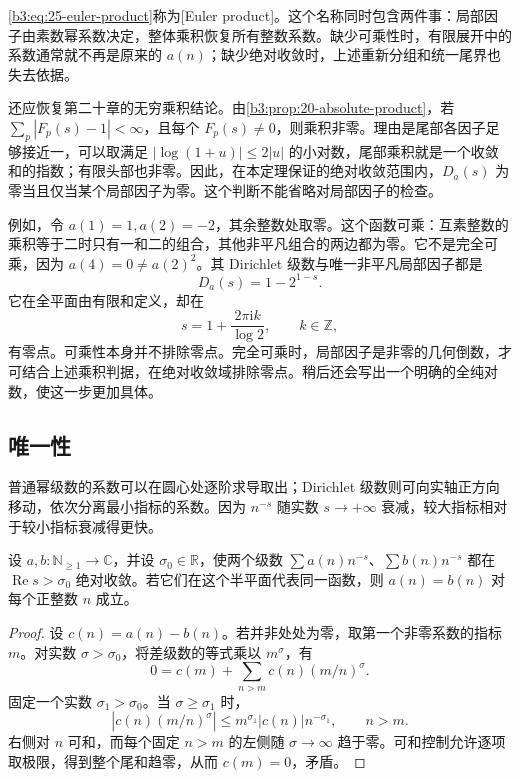 \eqref{b3:eq:25-euler-product}称为[Euler product]。这个名称同时包含两件事：局部因子由素数幂系数决定，整体乘积恢复所有整数系数。缺少可乘性时，有限展开中的系数通常就不再是原来的 \(a(n)\)；缺少绝对收敛时，上述重新分组和统一尾界也失去依据。

还应恢复第二十章的无穷乘积结论。由\cref{b3:prop:20-absolute-product}，若 \(\sum_p|F_p(s)-1|<\infty\)，且每个 \(F_p(s)\ne0\)，则乘积非零。理由是尾部各因子足够接近一，可以取满足 \(|\log(1+u)|\le2|u|\) 的小对数，尾部乘积就是一个收敛和的指数；有限头部也非零。因此，在本定理保证的绝对收敛范围内，\(D_a(s)\) 为零当且仅当某个局部因子为零。这个判断不能省略对局部因子的检查。

例如，令 \(a(1)=1,a(2)=-2\)，其余整数处取零。这个函数可乘：互素整数的乘积等于二时只有一和二的组合，其他非平凡组合的两边都为零。它不是完全可乘，因为 \(a(4)=0\ne a(2)^2\)。其 Dirichlet 级数与唯一非平凡局部因子都是
\[
 D_a(s)=1-2^{1-s}.
\]
它在全平面由有限和定义，却在
\[
 s=1+\frac{2\pi\mathrm i k}{\log2},\qquad k\in\mathbb Z,
\]
有零点。可乘性本身并不排除零点。完全可乘时，局部因子是非零的几何倒数，才可结合上述乘积判据，在绝对收敛域排除零点。稍后还会写出一个明确的全纯对数，使这一步更加具体。

\subsection{唯一性}
\label{b3:subsec:250502}

普通幂级数的系数可以在圆心处逐阶求导取出；Dirichlet 级数则可向实轴正方向移动，依次分离最小指标的系数。因为 \(n^{-s}\) 随实数 \(s\to+\infty\) 衰减，较大指标相对于较小指标衰减得更快。

\begin{proposition}\label{b3:prop:25-uniqueness}
设 \(a,b:\mathbb N_{\ge1}\to\mathbb C\)，并设 \(\sigma_0\in\mathbb R\)，使两个级数 \(\sum a(n)n^{-s}\)、\(\sum b(n)n^{-s}\) 都在 \(\operatorname{Re}s>\sigma_0\) 绝对收敛。若它们在这个半平面代表同一函数，则 \(a(n)=b(n)\) 对每个正整数 \(n\) 成立。
\end{proposition}
\begin{proof}
设 \(c(n)=a(n)-b(n)\)。若并非处处为零，取第一个非零系数的指标 \(m\)。对实数 \(\sigma>\sigma_0\)，将差级数的等式乘以 \(m^\sigma\)，有
\[
 0=c(m)+\sum_{n>m}c(n)(m/n)^\sigma.
\]
固定一个实数 \(\sigma_1>\sigma_0\)。当 \(\sigma\ge\sigma_1\) 时，
\[
 |c(n)(m/n)^\sigma|
 \le m^{\sigma_1}|c(n)|n^{-\sigma_1},\qquad n>m.
\]
右侧对 \(n\) 可和，而每个固定 \(n>m\) 的左侧随 \(\sigma\to\infty\) 趋于零。可和控制允许逐项取极限，得到整个尾和趋零，从而 \(c(m)=0\)，矛盾。
\end{proof}


